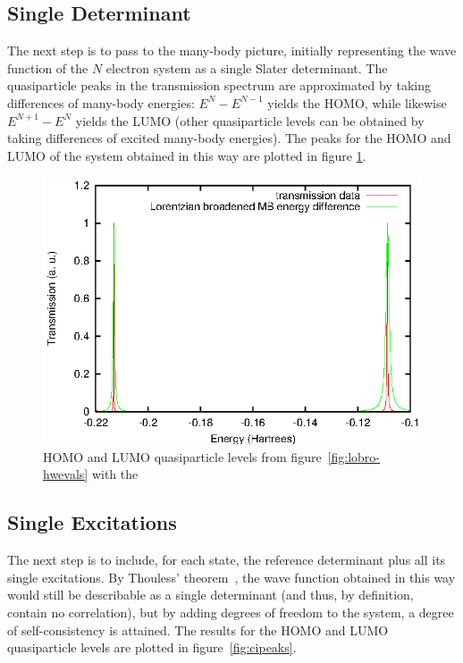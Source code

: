 \subsection{Single Determinant}
\label{subsec:SingleDeterminant}

The next step is to pass to the many-body picture, initially representing the
wave function of the $N$ electron system as a single Slater determinant. The
quasiparticle peaks in the transmission spectrum are approximated by taking
differences of many-body energies: $E^N - E^{N-1}$ yields the \ac{HOMO}, while
likewise $E^{N+1} - E^N$ yields the \ac{LUMO} (other quasiparticle levels can be
obtained by taking differences of excited many-body energies). The peaks for
the \ac{HOMO} and \ac{LUMO} of the system obtained in this way are plotted in figure
\ref{fig:nobranch}.

\begin{figure}
	\begin{center}
		\includegraphics[width=0.9\linewidth]{figures/nobranch}
	\end{center}
	\caption{\ac{HOMO} and \ac{LUMO} quasiparticle levels from
	figure~\ref{fig:lobro-hwevals} with the }
	\label{fig:nobranch}
\end{figure}

\subsection{Single Excitations}
\label{subsec:singles}

The next step is to include, for each state, the reference determinant plus all
its single excitations. By Thouless' theorem~\cite{Thouless}, the wave function
obtained in this way would still be describable as a single determinant (and
thus, by definition, contain no correlation), but by adding degrees of freedom
to the system, a degree of self-consistency is attained. The results for the
\ac{HOMO} and \ac{LUMO} quasiparticle levels are plotted in
figure~\ref{fig:cipeaks}.

